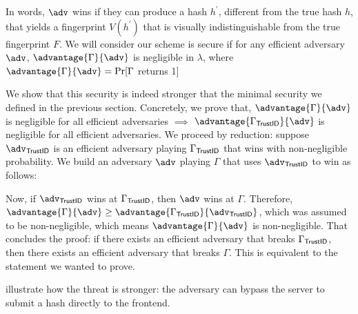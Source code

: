 \documentclass{article}
\begin{document}
In words, $\adv$ wins if they can produce a hash $h^\prime$, different from the true hash $h$, that yields a fingerprint $V(h^\prime)$ that is visually indistinguishable from the true fingerprint $F$. 
We will consider our scheme is secure if for any efficient adversary $\adv$, $\advantage{\Gamma}{\adv}$ is negligible in $\lambda$, where $\advantage{\Gamma}{\adv} = \Pr[\Gamma$ returns 1]

We show that this security is indeed stronger that the minimal security we defined in the previous section. Concretely, we prove that, $\advantage{\Gamma}{\adv}$ is negligible for all efficient adversaries $\implies $ $\advantage{\gid}{\adv}$ is negligible for all efficient adversaries. We proceed by reduction: suppose $\adv_\mathsf{TrustID}$ is an efficient adversary playing $\Gamma_{\mathsf{TrustID}}$ that wins with non-negligible probability. We build an adversary $\adv$ playing $\Gamma$ that uses $\adv_\mathsf{TrustID}$ to win as follows:

\begin{pchstack}[space=2em,center]
\end{pchstack}

Now, if $\adv_\mathsf{TrustID}$ wins at $\Gamma_{\mathsf{TrustID}}$, then $\adv$ wins at $\Gamma$. Therefore, $\advantage{\Gamma}{\adv} \geq \advantage{\gid}{\adv_\mathsf{TrustID}}$, which was assumed to be non-negligible, which means $\advantage{\Gamma}{\adv}$ is non-negligible.
That concludes the proof: if there exists an efficient adversary that breaks $\Gamma_{\mathsf{TrustID}}$, then there exists an efficient adversary that breaks $\Gamma$. This is equivalent to the statement we wanted to prove.

 illustrate how the threat is stronger: the adversary can bypass the server to submit a hash directly to the frontend.
\end{document}
